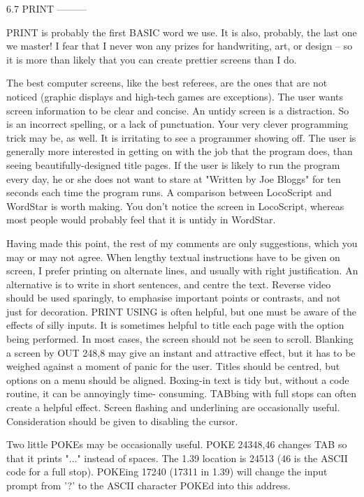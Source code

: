 6.7 PRINT
---------

PRINT is probably the first BASIC word we use. It is also, probably, the  last 
one  we  master! I fear that I never won any prizes for handwriting,  art,  or 
design -- so it is more than likely that you can create prettier screens  than 
I do.

The  best computer screens, like the best referees, are the ones that are  not 
noticed (graphic displays and high-tech games are exceptions). The user  wants 
screen information to be clear and concise. An untidy screen is a distraction. 
So  is  an  incorrect spelling, or a lack of  punctuation.  Your  very  clever 
programming  trick  may  be, as well. It is irritating  to  see  a  programmer 
showing off. The user is generally more interested in getting on with the  job 
that  the program does, than seeing beautifully-designed title pages.  If  the 
user is likely to run the program every day, he or she does not want to  stare 
at  "Written  by  Joe Bloggs" for ten seconds each time the  program  runs.  A 
comparison  between LocoScript and WordStar is worth making. You don't  notice 
the  screen in LocoScript, whereas most people would probably feel that it  is 
untidy in WordStar.

Having  made this point, the rest of my comments are only  suggestions,  which 
you  may or may not agree. When lengthy textual instructions have to be  given 
on  screen,  I  prefer printing on alternate lines,  and  usually  with  right 
justification.  An alternative is to write in short sentences, and centre  the 
text. Reverse video should be used sparingly, to emphasise important points or 
contrasts, and not just for decoration. PRINT USING is often helpful, but  one 
must be aware of the effects of silly inputs. It is sometimes helpful to title 
each  page with the option being performed. In most cases, the  screen  should 
not be seen to scroll. Blanking a screen by OUT 248,8 may give an instant  and 
attractive effect, but it has to be weighed against a moment of panic for  the 
user.  Titles  should  be centred, but options on a menu  should  be  aligned. 
Boxing-in text is tidy but, without a code routine, it can be annoyingly time-
consuming.  TABbing with full stops can often create a helpful effect.  Screen 
flashing  and  underlining are occasionally useful.  Consideration  should  be 
given to disabling the cursor.

Two little POKEs may be occasionally useful. POKE 24348,46 changes TAB so that 
it prints "..." instead of spaces. The 1.39 location is 24513 (46 is the ASCII 
code  for  a full stop). POKEing 17240 (17311 in 1.39) will change  the  input 
prompt from '?' to the ASCII character POKEd into this address.


